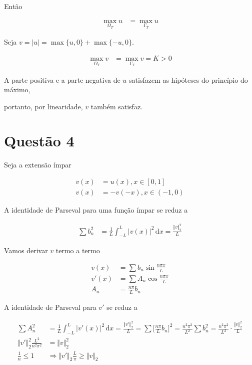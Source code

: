 \documentclass[12pt,a4paper]{article}
\begin{document}
		Ent\~ao

		\begin{align}
			\max_{\Omega_T} u &= \max_{\Gamma_T} u
		\end{align}

		Seja $v = |u| = \max \{ u , 0 \} + \max \{ -u, 0 \}$.

		\begin{align}
			\max_{\Omega_T} v &= \max_{\Gamma_T} v = K > 0
		\end{align}

		A parte positiva e a parte negativa de $u$ satisfazem as hip\'oteses do princ\'ipio do m\'aximo,

		portanto, por linearidade, $v$ tamb\'em satisfaz.

		\begin{flushright}
		\end{flushright}

	\section{Quest\~ao 4}
		\begin{flushright}
		\end{flushright}

		Seja a extens\~ao \'impar

		\begin{align}
			v(x) &= u(x), x \in [0, 1] \\
			v(x) &= -v(-x), x \in (-1, 0)
		\end{align}

		A identidade de Parseval para uma fun\c{c}\~ao \'impar se reduz a

		\begin{align}
			\sum b_n^2 &= \frac{1}{L} \int_{-L}^L |v(x)|^2 \,\mathrm{d}x = \frac{\Vert v \Vert_2^2}{L}
		\end{align}

		Vamos derivar $v$ termo a termo

		\begin{align}
			v(x) &= \sum b_n \sin \frac{n\pi x}{L} \\
			v'(x) &= \sum A_n \cos \frac{n\pi x}{L} \\
			A_n &= \frac{n\pi}{L} b_n
		\end{align}

		A identidade de Parseval para $v'$ se reduz a

		\begin{align}
			\sum A_n^2 &= \frac{1}{L} \int_{-L}^L |v'(x)|^2 \,\mathrm{d}x = \frac{\Vert v' \Vert_2^2}{L} = \sum \bigg[\frac{n\pi}{L} b_n\bigg]^2 = \frac{n^2\pi^2}{L^2} \sum b_n^2 = \frac{n^2\pi^2}{L^2} \cdot \frac{\Vert v \Vert_2^2}{L} \\
			\Vert v' \Vert_2^2 \frac{L^2}{n^2\pi^2} &= \Vert v \Vert_2^2 \\
			\frac{1}{n} \le 1 &\Rightarrow \Vert v' \Vert_2 \frac{L}{\pi} \ge \Vert v \Vert_2
		\end{align}
\end{document}
